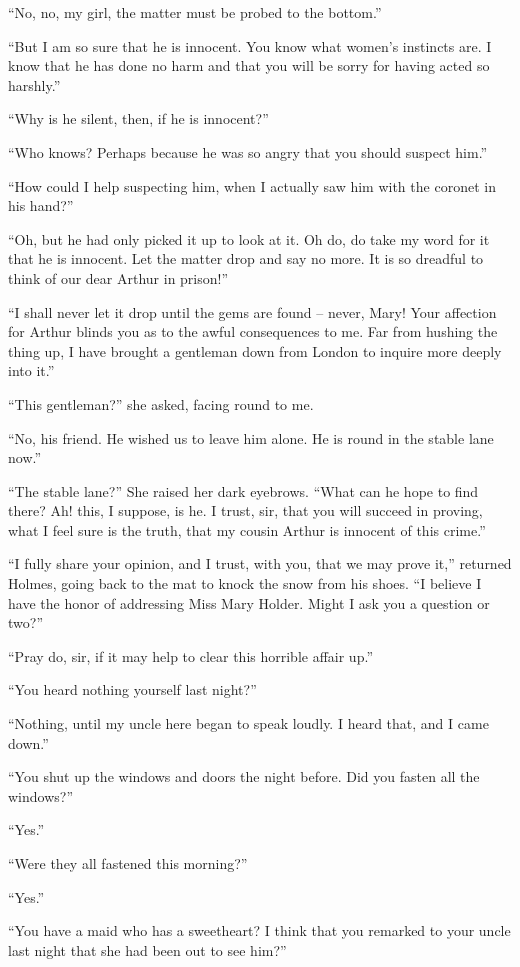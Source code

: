 “No, no, my girl, the matter must be probed to the bottom.”

“But I am so sure that he is innocent. You know what
women’s instincts are. I know that he has done no harm
and that you will be sorry for having acted so harshly.”

“Why is he silent, then, if he is innocent?”

“Who knows? Perhaps because he was so angry that you
should suspect him.”

“How could I help suspecting him, when I actually saw
him with the coronet in his hand?”

“Oh, but he had only picked it up to look at it. Oh do,
do take my word for it that he is innocent. Let the matter
drop and say no more. It is so dreadful to think of our dear
Arthur in prison!”

“I shall never let it drop until the gems are found -- never,
Mary! Your affection for Arthur blinds you as to the awful
consequences to me. Far from hushing the thing up, I have
brought a gentleman down from London to inquire more
deeply into it.”

“This gentleman?” she asked, facing round to me.

“No, his friend. He wished us to leave him alone. He is
round in the stable lane now.”

“The stable lane?” She raised her dark eyebrows. “What
can he hope to find there? Ah! this, I suppose, is he. I
trust, sir, that you will succeed in proving, what I feel sure is
the truth, that my cousin Arthur is innocent of this crime.”

“I fully share your opinion, and I trust, with you, that we
may prove it,” returned Holmes, going back to the mat to
knock the snow from his shoes. “I believe I have the honor
of addressing Miss Mary Holder. Might I ask you a question
or two?”

“Pray do, sir, if it may help to clear this horrible affair up.”

“You heard nothing yourself last night?”

“Nothing, until my uncle here began to speak loudly. I
heard that, and I came down.”

“You shut up the windows and doors the night before.
Did you fasten all the windows?”

“Yes.”

“Were they all fastened this morning?”

“Yes.”

“You have a maid who has a sweetheart? I think that you
remarked to your uncle last night that she had been out to
see him?”

